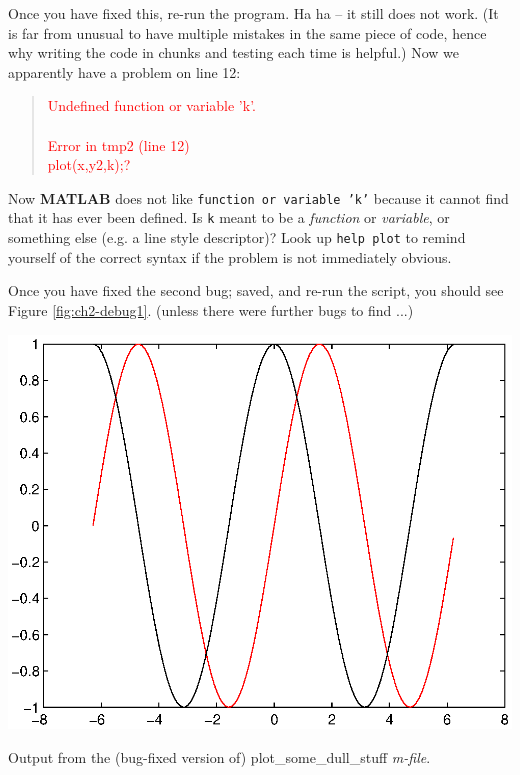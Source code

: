 \documentclass{tufte-book} %
\newenvironment{docspec}{\begin{quotation}\ttfamily\parskip0pt\parindent0pt\ignorespaces}{\end{quotation}}
\begin{document}
Once you have fixed this, re-run the program. Ha ha -- it still does not work. (It is far from unusual to have multiple mistakes in the same piece of code, hence why writing the code in chunks and testing each time is helpful.)
\noindent Now we apparently have a problem on line 12:

\begin{docspec}
\textcolor{red}{Undefined function or variable 'k'.
\\ \
\\ Error in tmp2 (line 12)
\\ plot(x,y2,k);?}
\end{docspec}

\noindent Now \textbf{MATLAB} does not like \texttt{function or variable 'k'} because it cannot find that it has ever been defined. Is \texttt{k} meant to be a \textit{function} or \textit{variable}, or something else (e.g. a line style descriptor)? Look up \texttt{help plot} to remind yourself of the correct syntax if the problem is not immediately obvious.

Once you have fixed the second bug; saved, and re-run the script, you should see Figure \ref{fig:ch2-debug1}. (unless there were further bugs to find ...)

\begin{marginfigure}[1.5in]
\includegraphics[width=\linewidth]{ch2-debug1.eps}
\caption{Output from the (bug-fixed version of) \textsf{plot\_some\_dull\_stuff} \textit{m-file}.}
\label{fig:ch2-debug1}
\end{marginfigure}
\end{document}

